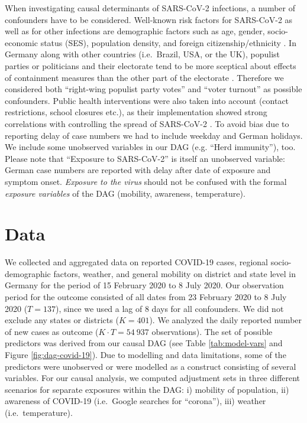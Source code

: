 \documentclass[]{elsarticle} %
\begin{document}
When investigating causal determinants of SARS-CoV-2 infections, a
number of confounders have to be considered. Well-known risk factors for
SARS-CoV-2 as well as for other infections are demographic factors such
as age, gender, socio-economic status (SES), population density, and
foreign citizenship/ethnicity
\citep{de2020risk, Dragano2020.06.17.20133918, jhucovid19db2020}. In
Germany along with other countries (i.e.~Brazil, USA, or the UK),
populist parties or politicians and their electorate tend to be more
sceptical about effects of containment measures than the other part of
the electorate \citep{dohle_wingen_schreiber_2020, engle_staying_2020}.
Therefore we considered both ``right-wing populist party votes'' and
``voter turnout'' as possible confounders. Public health interventions
were also taken into account (contact restrictions, school closures
etc.), as their implementation showed strong correlations with
controlling the spread of SARS-CoV-2
\citep{cowling2020impact, juni_impact_2020, lai_effect_2020}. To avoid
bias due to reporting delay of case numbers we had to include weekday
and German holidays. We include some unobserved variables in our DAG
(e.g. ``Herd immunity''), too. Please note that ``Exposure to
SARS-CoV-2'' is itself an unobserved variable: German case numbers are
reported with delay after date of exposure and symptom onset.
\emph{Exposure to the virus} should not be confused with the formal
\emph{exposure variables} of the DAG (mobility, awareness, temperature).

\section{Data}\label{data}

We collected and aggregated data on reported COVID-19 cases, regional
socio-demographic factors, weather, and general mobility on district and
state level in Germany for the period of 15 February 2020 to 8 July
2020. Our observation period for the outcome consisted of all dates from
23 February 2020 to 8 July 2020 (\(T=137\)), since we used a lag of 8
days for all confounders. We did not exclude any states or districts
(\(K=401\)). We analyzed the daily reported number of new cases as
outcome (\(K\cdot T=54{\ }937\) observations). The set of possible
predictors was derived from our causal DAG (see Table
\ref{tab:model-vars} and Figure \ref{fig:dag-covid-19}). Due to
modelling and data limitations, some of the predictors were unobserved
or were modelled as a construct consisting of several variables. For our
causal analysis, we computed adjustment sets in three different
scenarios for separate exposures within the DAG: i) mobility of
population, ii) awareness of COVID-19 (i.e.~Google searches for
``corona''), iii) weather (i.e.~temperature).
\end{document}
